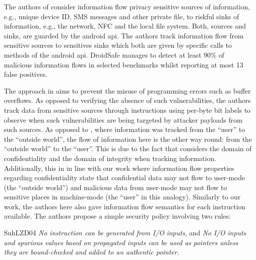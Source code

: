 The authors of \cite{GordonKPGNR15} consider information flow privacy sensitive sources of information, e.g., unique device ID, SMS messages and other private file, to riskful sinks of information, e.g., the network, NFC and the local file system.
Both, sources and sinks, are guarded by the android \gls{api}.
The authors track information flow from sensitive sources to sensitives sinks which both are given by specific calls to methods of the android \gls{api}.
DroidSafe manages to detect at least 90\% of malicious information flows in selected benchmarks whilst reporting at most 13 false positives.

The approach in \cite{SuhLZD04} aims to prevent the misuse of programming errors such as buffer overflows.
As opposed to verifying the absence of such vulnerabilities, the authors track data from sensitive sources through instructions using per-byte bit labels to observe when such vulnerabilities are being targeted by attacker payloads from such sources.
As opposed to \cite{GordonKPGNR15}, where information was tracked from the \enquote{user} to the \enquote{outside world}, the flow of information here is the other way round: from the \enquote{outside world} to the \enquote{user}.
This is due to the fact that \cite{GordonKPGNR15} considers the domain of confidentiality and \cite{SuhLZD04} the domain of integrity when tracking information.
Additionally, this in in line with our work where information flow properties regarding confidentiality state that confidential data may not flow to user-mode (the \enquote{outside world}) and malicious data from user-mode may not flow to sensitive places in machine-mode (the \enquote{user} in this analogy).
Similarly to our work, the authors here also gave information flow semantics for each instruction available.
The authors propose a simple security policy involving two rules:
\begin{displaycquote}{SuhLZD04}
    \textit{No instruction can be generated from I/O inputs}, and \textit{No I/O inputs and spurious values based on propagated inputs can be used as pointers unless they are bound-checked and added to an authentic pointer}.
\end{displaycquote}

